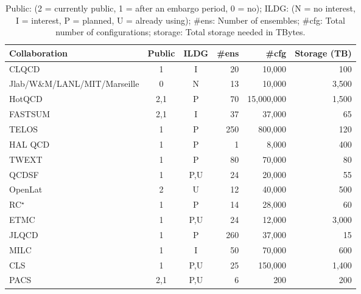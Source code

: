 \documentclass[a4paper,11pt]{article}
\begin{document}
\begin{table}[h]
  \caption{ Public: (2 = currently public, 1 = after an embargo period, 0 = no); ILDG: (N = no interest, I =
    interest, P = planned, U = already using); \#ens: Number of
    ensembles; \#cfg: Total number of configurations; storage: Total
    storage needed in TBytes.
    \label{tab:summary}
  }
  \centering
  \begin{tabular}{lccrrr}\hline\hline
    Collaboration                & Public & ILDG & \#ens & \#cfg   & Storage (TB) \\\hline
    CLQCD                        & 1      & I    & 20    & 10,000  & 100          \\
    Jlab/W\&M/LANL/MIT/Marseille & 0      & N    & 13    & 10,000  & 3,500        \\
    HotQCD                       & 2,1    & P    & 70    & 15,000,000        & 1,500             \\
    FASTSUM                      & 2,1    & I    & 37    & 37,000  & 65           \\
    TELOS                        & 1      & P    & 250   & 800,000 & 120          \\
    HAL QCD                      & 1      & P    &  1    &  8,000  & 400          \\
    TWEXT                        & 1      & P    & 80    & 70,000  & 80           \\
    QCDSF                        & 1      & P,U  & 24    & 20,000  & 55           \\
    OpenLat                      & 2      & U    & 12    & 40,000  & 500          \\
    RC$^\star$                   & 1      & P    & 14    & 28,000  & 60           \\
    ETMC                         & 1      & P,U  & 24    & 12,000  & 3,000        \\
    JLQCD                        & 1      & P    & 260   & 37,000  & 15           \\
    MILC                         & 1      & I    & 50    & 70,000  & 600          \\
    CLS                          & 1      & P,U  & 25    & 150,000 & 1,400        \\
    PACS                         & 2,1    & P,U  & 6     & 200     & 200          \\\hline\hline
  \end{tabular}
\end{table}
\end{document}
